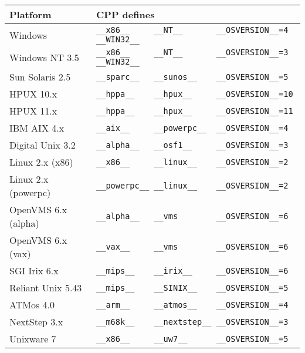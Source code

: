 \documentclass[11pt,oneside,a4paper]{book}
\begin{document}
\begin{flushleft}
\begin{tabular}{|l|l|}
\hline
Platform            & CPP defines \\
\hline
Windows             & \verb|__x86__     __NT__       __OSVERSION__=4  __WIN32__| \\

Windows NT 3.5      & \verb|__x86__     __NT__       __OSVERSION__=3  __WIN32__| \\

Sun Solaris 2.5     & \verb|__sparc__   __sunos__    __OSVERSION__=5| \\

HPUX 10.x           & \verb|__hppa__    __hpux__     __OSVERSION__=10| \\

HPUX 11.x           & \verb|__hppa__    __hpux__     __OSVERSION__=11| \\

IBM AIX 4.x         & \verb|__aix__     __powerpc__  __OSVERSION__=4| \\

Digital Unix 3.2    & \verb|__alpha__   __osf1__     __OSVERSION__=3| \\

Linux 2.x (x86)     & \verb|__x86__     __linux__    __OSVERSION__=2| \\

Linux 2.x (powerpc) & \verb|__powerpc__ __linux__    __OSVERSION__=2| \\

OpenVMS 6.x (alpha) & \verb|__alpha__   __vms        __OSVERSION__=6 | \\

OpenVMS 6.x (vax)   & \verb|__vax__     __vms        __OSVERSION__=6 | \\

SGI Irix 6.x        & \verb|__mips__    __irix__     __OSVERSION__=6 | \\

Reliant Unix 5.43   & \verb|__mips__    __SINIX__    __OSVERSION__=5 | \\

ATMos 4.0           & \verb|__arm__     __atmos__    __OSVERSION__=4| \\

NextStep 3.x        & \verb|__m68k__    __nextstep__ __OSVERSION__=3| \\

Unixware 7          & \verb|__x86__     __uw7__      __OSVERSION__=5| \\
\hline
\end{tabular}
\end{flushleft}
\end{document}
